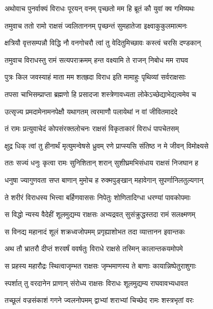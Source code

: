 
\twolineshloka
{अथोवाच पुनर्वाक्यं विराधः पूरयन् वनम्}
{पृच्छतो मम हि ब्रूतं कौ युवां क्व गमिष्यथः} %

\twolineshloka
{तमुवाच ततो रामो राक्षसं ज्वलिताननम्}
{पृच्छन्तं सुमहातेजा इक्ष्वाकुकुलमात्मनः} %

\twolineshloka
{क्षत्रियौ वृत्तसम्पन्नौ विद्धि नौ वनगोचरौ}
{त्वां तु वेदितुमिच्छावः कस्त्वं चरसि दण्डकान्} %

\twolineshloka
{तमुवाच विराधस्तु रामं सत्यपराक्रमम्}
{हन्त वक्ष्यामि ते राजन् निबोध मम राघव} %

\twolineshloka
{पुत्रः किल जवस्याहं माता मम शतह्रदा}
{विराध इति मामाहुः पृथिव्यां सर्वराक्षसाः} %

\twolineshloka
{तपसा चाभिसम्प्राप्ता ब्रह्मणो हि प्रसादजा}
{शस्त्रेणावध्यता लोकेऽच्छेद्याभेद्यत्वमेव च} %

\twolineshloka
{उत्सृज्य प्रमदामेनामनपेक्षौ यथागतम्}
{त्वरमाणौ पलायेथां न वां जीवितमाददे} %

\twolineshloka
{तं रामः प्रत्युवाचेदं कोपसंरक्तलोचनः}
{राक्षसं विकृताकारं विराधं पापचेतसम्} %

\twolineshloka
{क्षुद्र धिक् त्वां तु हीनार्थं मृत्युमन्वेषसे ध्रुवम्}
{रणे प्राप्स्यसि संतिष्ठ न मे जीवन् विमोक्ष्यसे} %

\twolineshloka
{ततः सज्यं धनुः कृत्वा रामः सुनिशितान् शरान्}
{सुशीघ्रमभिसंधाय राक्षसं निजघान ह} %

\twolineshloka
{धनुषा ज्यागुणवता सप्त बाणान् मुमोच ह}
{रुक्मपुङ्खान् महावेगान् सुपर्णानिलतुल्यगान्} %

\twolineshloka
{ते शरीरं विराधस्य भित्त्वा बर्हिणवाससः}
{निपेतुः शोणितादिग्धा धरण्यां पावकोपमाः} %

\twolineshloka
{स विद्धो न्यस्य वैदेहीं शूलमुद्यम्य राक्षसः}
{अभ्यद्रवत् सुसंक्रुद्धस्तदा रामं सलक्ष्मणम्} %

\twolineshloka
{स विनद्य महानादं शूलं शक्रध्वजोपमम्}
{प्रगृह्याशोभत तदा व्यात्तानन इवान्तकः} %

\twolineshloka
{अथ तौ भ्रातरौ दीप्तं शरवर्षं ववर्षतुः}
{विराधे राक्षसे तस्मिन् कालान्तकयमोपमे} %

\twolineshloka
{स प्रहस्य महारौद्रः स्थित्वाजृम्भत राक्षसः}
{जृम्भमाणस्य ते बाणाः कायान्निष्पेतुराशुगाः} %

\twolineshloka
{स्पर्शात् तु वरदानेन प्राणान् संरोध्य राक्षसः}
{विराधः शूलमुद्यम्य राघवावभ्यधावत} %

\twolineshloka
{तच्छूलं वज्रसंकाशं गगने ज्वलनोपमम्}
{द्वाभ्यां शराभ्यां चिच्छेद रामः शस्त्रभृतां वरः} %

